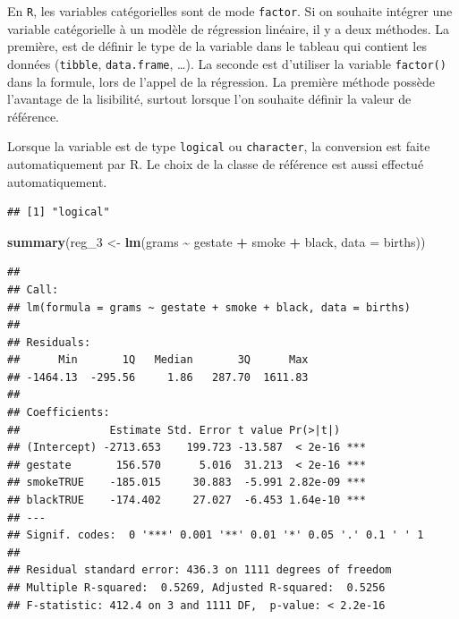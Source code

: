 \documentclass[
  11pt,
]{book}
\newenvironment{Shaded}{\begin{snugshade}}{\end{snugshade}}
\newcommand{\DataTypeTok}[1]{\textcolor[rgb]{0.13,0.29,0.53}{#1}}
\newcommand{\DecValTok}[1]{\textcolor[rgb]{0.00,0.00,0.81}{#1}}
\newcommand{\KeywordTok}[1]{\textcolor[rgb]{0.13,0.29,0.53}{\textbf{#1}}}
\newcommand{\NormalTok}[1]{#1}
\newcommand{\OperatorTok}[1]{\textcolor[rgb]{0.81,0.36,0.00}{\textbf{#1}}}
\newcommand{\StringTok}[1]{\textcolor[rgb]{0.31,0.60,0.02}{#1}}
\numberwithin{equation}{section}
\numberwithin{countremarque}{section}
\begin{document}
En \texttt{R}, les variables catégorielles sont de mode \texttt{factor}. Si on souhaite intégrer une variable catégorielle à un modèle de régression linéaire, il y a deux méthodes. La première, est de définir le type de la variable dans le tableau qui contient les données (\texttt{tibble}, \texttt{data.frame}, \ldots). La seconde est d'utiliser la variable \texttt{factor()} dans la formule, lors de l'appel de la régression. La première méthode possède l'avantage de la lisibilité, surtout lorsque l'on souhaite définir la valeur de référence.

Lorsque la variable est de type \texttt{logical} ou \texttt{character}, la conversion est faite automatiquement par R. Le choix de la classe de référence est aussi effectué automatiquement.

\begin{Shaded}
\end{Shaded}

\begin{lstlisting}
## [1] "logical"
\end{lstlisting}

\begin{Shaded}
\begin{Highlighting}[]
\KeywordTok{summary}\NormalTok{(reg\_}\DecValTok{3}\NormalTok{ \textless{}{-}}\StringTok{ }
\StringTok{          }\KeywordTok{lm}\NormalTok{(grams }\OperatorTok{\textasciitilde{}}\StringTok{ }\NormalTok{gestate }\OperatorTok{+}\StringTok{ }\NormalTok{smoke }\OperatorTok{+}\StringTok{ }\NormalTok{black,}
             \DataTypeTok{data =}\NormalTok{ births))}
\end{Highlighting}
\end{Shaded}

\begin{lstlisting}
## 
## Call:
## lm(formula = grams ~ gestate + smoke + black, data = births)
## 
## Residuals:
##      Min       1Q   Median       3Q      Max 
## -1464.13  -295.56     1.86   287.70  1611.83 
## 
## Coefficients:
##              Estimate Std. Error t value Pr(>|t|)    
## (Intercept) -2713.653    199.723 -13.587  < 2e-16 ***
## gestate       156.570      5.016  31.213  < 2e-16 ***
## smokeTRUE    -185.015     30.883  -5.991 2.82e-09 ***
## blackTRUE    -174.402     27.027  -6.453 1.64e-10 ***
## ---
## Signif. codes:  0 '***' 0.001 '**' 0.01 '*' 0.05 '.' 0.1 ' ' 1
## 
## Residual standard error: 436.3 on 1111 degrees of freedom
## Multiple R-squared:  0.5269, Adjusted R-squared:  0.5256 
## F-statistic: 412.4 on 3 and 1111 DF,  p-value: < 2.2e-16
\end{lstlisting}
\end{document}
